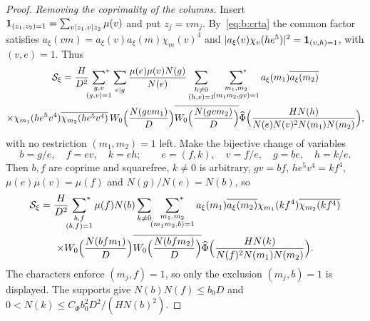 \begin{proof}
\emph{Removing the coprimality of the columns.} Insert $\mathbf{1}_{(z_1,z_2)=1}=\sum_{v\mid z_1,v\mid z_2}\mu(v)$ and put $z_j=vm_j$. By~\eqref{eq:b:crta} the common factor satisfies $a_\xi(vm)=a_\xi(v)a_\xi(m)\chi_m(v)^4$ and $|a_\xi(v)\chi_v(he^5)|^2=\mathbf{1}_{(v,h)=1}$, with $(v,e)=1$. Thus
\begin{multline*}
  \mathcal S_\xi=\frac H{D^2}\sideset{}{^*}\sum_{\substack{g,v\\(g,v)=1}}\sum_{e\mid g}\frac{\mu(e)\mu(v)N(g)}{N(e)}\sum_{\substack{h\ne0\\(h,v)=1}}\sideset{}{^*}\sum_{\substack{m_1,m_2\\(m_1m_2,gv)=1}}a_\xi(m_1)\overline{a_\xi(m_2)}\\
  \times\chi_{m_1}(he^5v^4)\overline{\chi_{m_2}(he^5v^4)}\,W_0\Bigl(\frac{N(gvm_1)}D\Bigr)\overline{W_0\Bigl(\frac{N(gvm_2)}D\Bigr)}\widehat\Phi\Bigl(\frac{HN(h)}{N(e)N(v)^2N(m_1)N(m_2)}\Bigr),
\end{multline*}
with no restriction $(m_1,m_2)=1$ left. Make the bijective change of variables
\[
  b=g/e,\quad f=ev,\quad k=eh;\qquad e=(f,k),\quad v=f/e,\quad g=be,\quad h=k/e.
\]
Then $b,f$ are coprime and squarefree, $k\ne0$ is arbitrary, $gv=bf$, $he^5v^4=kf^4$, $\mu(e)\mu(v)=\mu(f)$ and $N(g)/N(e)=N(b)$, so
\begin{multline}\label{eq:b:columnoutput}
  \mathcal S_\xi=\frac H{D^2}\sideset{}{^*}\sum_{\substack{b,f\\(b,f)=1}}\mu(f)N(b)\sum_{k\ne0}\sideset{}{^*}\sum_{\substack{m_1,m_2\\(m_1m_2,b)=1}}a_\xi(m_1)\overline{a_\xi(m_2)}\chi_{m_1}(kf^4)\overline{\chi_{m_2}(kf^4)}\\
  \times W_0\Bigl(\frac{N(bfm_1)}D\Bigr)\overline{W_0\Bigl(\frac{N(bfm_2)}D\Bigr)}\widehat\Phi\Bigl(\frac{HN(k)}{N(f)^2N(m_1)N(m_2)}\Bigr).
\end{multline}
The characters enforce $(m_j,f)=1$, so only the exclusion $(m_j,b)=1$ is displayed. The supports give $N(b)N(f)\le b_0D$ and $0<N(k)\le C_\Phi b_0^2D^2/(HN(b)^2)$.


\end{proof}
